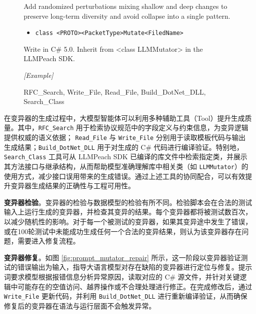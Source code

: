 \begin{figure}[H]
\begin{tcolorbox}[
  before upper=\linespread{1.2}\selectfont
]
\begin{enumerate}[noitemsep,leftmargin=*]
\begin{enumerate}[noitemsep]
        Add randomized perturbations mixing shallow and deep changes to preserve long-term diversity and avoid collapse into a single pattern.

        \begin{itemize}[noitemsep, label={},leftmargin=*]
            \item \texttt{class <PROTO><PacketType>Mutate<FiledName>}
        \end{itemize}
    \end{enumerate}
\end{enumerate}
Write in C\# 5.0. Inherit from <class LLMMutator> in the LLMPeach SDK.

\textit{[Example]}

\prule

 RFC\_Search, Write\_File, Read\_File, Build\_DotNet\_DLL, Search\_Class
\end{tcolorbox}
\label{fig:prompt_mutator_gen}
\end{figure}

在变异器的生成过程中，大模型智能体可以利用多种辅助工具（Tool）提升生成质量。其中，\texttt{RFC\_Search} 用于检索协议规范中的字段定义与约束信息，为变异逻辑提供权威的语义依据；
\texttt{Read\_File} 与 \texttt{Write\_File} 分别用于读取模板代码与输出生成结果；\texttt{Build\_DotNet\_DLL} 用于对生成的 C\# 代码进行编译验证。特别地，\texttt{Search\_Class} 工具可从 LLMPeach SDK 已编译的库文件中检索指定类，并展示其方法接口与继承结构，从而帮助模型准确理解库中相关类（如 \texttt{LLMMutator}）的使用方式，减少接口误用带来的生成错误。通过上述工具的协同配合，可以有效提升变异器生成结果的正确性与工程可用性。

\textbf{变异器检验}。变异器的检验与数据模型的检验有所不同。检验脚本会在合法的测试输入上运行生成的变异器，并检查其变异的结果。每个变异器都将被测试数百次，以减少随机性的影响。对于每一个被测试的变异器，如果其变异途中发生了错误，或在100轮测试中未能成功生成任何一个合法的变异结果，则认为该变异器存在问题，需要进入修复流程。

\textbf{变异器修复}。如图 \ref{fig:prompt_mutator_repair} 所示，这一阶段以变异器验证测试的错误输出为输入，指导大语言模型对存在缺陷的变异器进行定位与修复。提示词要求模型根据报错信息分析异常原因，读取对应的 C\# 源文件，并针对关键逻辑中可能存在的空值访问、越界操作或不合理处理进行修正。在完成修改后，通过 \texttt{Write\_File} 更新代码，并利用 \texttt{Build\_DotNet\_DLL} 进行重新编译验证，从而确保修复后的变异器在语法与运行层面不会触发异常。


